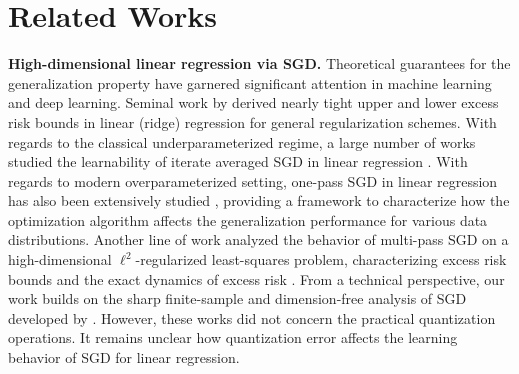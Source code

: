 \documentclass[11pt, letterpaper]{article}
\begin{document}
\section{Related Works}
\textbf{High-dimensional linear regression via SGD.} 
Theoretical guarantees for the generalization property have garnered significant attention in machine learning and deep learning. Seminal work by \citet{bartlett2020benign,tsigler2023benign} derived nearly tight upper and lower excess risk bounds in linear (ridge) regression for general regularization schemes. With regards to the classical underparameterized regime, a large number of works studied the learnability of iterate averaged SGD in linear regression \citep{polyak1992acceleration,defossez2015averaged,bach2013non,dieuleveut2017harder,jain2018parallelizing,jain2017markov}. With regards to modern overparameterized setting, one-pass SGD in linear regression has also been extensively studied \citep{dieuleveut2015non,berthier2020tight,varre2021last,zou2023benign,wu2022last,wu2022power,zhang2024optimality}, providing a framework to characterize how the optimization algorithm affects the generalization performance for various data distributions. 
Another line of work analyzed the behavior of multi-pass SGD on a high-dimensional $\ell^2$-regularized least-squares problem, characterizing excess risk bounds \citep{lei2021generalization,zou2022risk} and the exact dynamics of excess risk \citep{paquette2024homogenization}. 
From a technical perspective, our work builds on the sharp finite-sample and dimension-free analysis of SGD developed by \citet{zou2023benign}. However, these works did not concern the practical quantization operations. It remains unclear how quantization error affects the learning behavior of SGD for linear regression.
\end{document}
